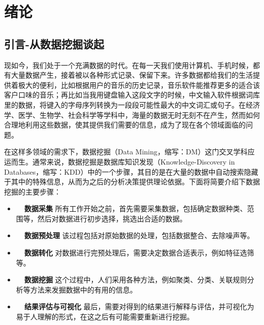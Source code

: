 
\chapter{绪论}
\section{引言-从数据挖掘谈起}
现如今，我们处于一个充满数据的时代。在每一天我们使用计算机、手机时候，都有大量数据产生，接着被以各种形式记录、保留下来。许多数据都给我们的生活提供着极大的便利，比如根据用户的音乐的历史记录，音乐软件能推荐更多的适合该客户口味的音乐；再比如当我用键盘输入这段文字的时候，中文输入软件根据词库里的数据，将键入的字母序列转换为一段段可能性最大的中文词汇或句子。在经济学、医学、生物学、社会科学等学科中，海量的数据无时无刻不在产生，然而如何合理地利用这些数据，使其提供我们需要的信息，成为了现在各个领域面临的问题。

在这样多领域的需求下，数据挖掘（Data Mining，缩写：DM）这门交叉学科应运而生。通常来说，数据挖掘是数据库知识发现（Knowledge-Discovery in Databases，缩写：KDD）中的一个步骤，其目的是在大量的数据中自动搜索隐藏于其中的特殊信息，从而为之后的分析决策提供理论依据。下面将简要介绍下数据挖掘的主要步骤：
\vspace{4mm}
\begin{itemize}
    \item \textbf{~~数据采集} 所有工作开始之前，首先需要采集数据，包括确定数据种类、范围等，然后对数据进行初步选择，挑选出合适的数据。
    \item \textbf{~~数据预处理} 该过程包括对原始数据的处理，包括数据整合、去除噪声等。
    \item \textbf{~~数据转化} 对数据进行完预处理后，需要决定数据合适表示，例如特征选筛等。
    \item \textbf{~~数据挖掘} 这个过程中，人们采用各种方法，例如聚类、分类、关联规则分析等方法来发掘数据中的有用的信息。
    \item \textbf{~~结果评估与可视化} 最后，需要对得到的结果进行解释与评估，并可视化为易于人理解的形式，在这之后有可能需要重新进行挖掘。
\end{itemize}


